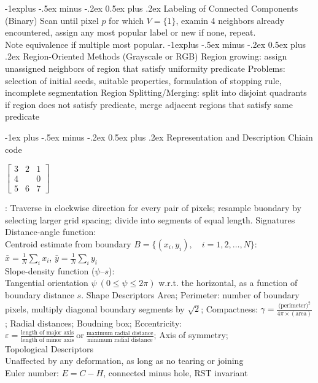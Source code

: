 \documentclass[dvipdfmx,a4paper,10pt,landscape]{article}
\makeatletter
\renewcommand{\section}{\@startsection{section}{1}{0mm}%
                                {-1ex plus -.5ex minus -.2ex}%
                                {0.5ex plus .2ex}%
                                {\normalfont\large\bfseries}}
\renewcommand{\subsection}{\@startsection{subsection}{2}{0mm}%
                                {-1explus -.5ex minus -.2ex}%
                                {0.5ex plus .2ex}%
                                {\normalfont\normalsize\bfseries}}
\makeatother
\begin{document}
\begin{multicols}{3}
    \subsection{Labeling of Connected Components (Binary)}
    Scan until pixel $p$ for which $V=\{1\}$, examin 4 neighbors already encountered, assign any most popular label or new if none, repeat.\\
    Note equivalence if multiple most popular.
    \subsection{Region-Oriented Methods (Grayscale or RGB)}
    Region growing: assign unassigned neighbors of region that satisfy uniformity predicate
    Problems: selection of initial seeds, suitable properties, formulation of stopping rule, incomplete segmentation
    Region Splitting/Merging: split into disjoint quadrants if region does not satisfy predicate, merge adjacent regions that satisfy same predicate

    \section{Representation and Description}
    Chiain code
    \begin{tiny}
        $\begin{bmatrix}
                3 & 2 & 1 \\
                4 &   & 0 \\
                5 & 6 & 7
            \end{bmatrix}$
    \end{tiny}:
    Traverse in clockwise direction for every pair of pixels; resample buondary by selecting larger grid spacing; divide into segments of equal length.
    Signatures\\
    Distance-angle function:\\
    Centroid estimate from boundary $B=\{(x_i,y_i),\quad i=1,2,\ldots,N\}$:\\
    $\bar{x}=\frac{1}{N}\sum_i x_i$, $\bar{y}=\frac{1}{N}\sum_i y_i$\\
    Slope-density function ($\psi$--$s$):\\
    Tangential orientation $\psi\ (0\leq \psi \leq 2\pi)$ w.r.t. the horizontal, as a function of boundary distance $s$.
    Shape Descriptors
    Area;
    Perimeter: number of boundary pixels, multiply diagonal boundary segments by $\sqrt{2}$;
    Compactness: $\gamma=\frac{\text{(perimeter)}^2}{4\pi\times(\text{area})}$;
    Radial distances;
    Boudning box;
    Eccentricity: $\varepsilon=\frac{\text{length of major axis}}{\text{length of minor axis}}\ \text{or}\ \frac{\text{maximum radial distance}}{\text{minimum radial distance}}$;
    Axis of symmetry;\\
    Topological Descriptors\\
    Unaffected by any deformation, as long as no tearing or joining\\
    Euler number: $E=C-H$, connected minus hole, RST invariant

\end{multicols}
\end{document}

